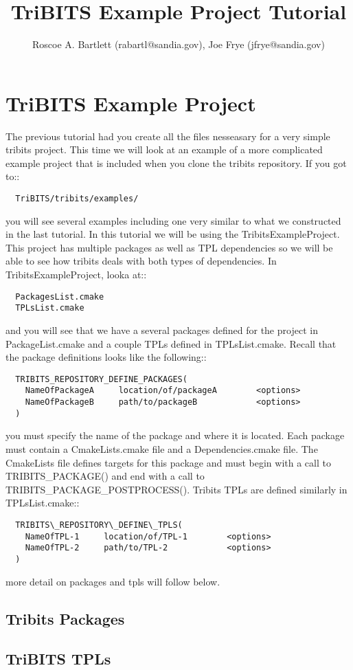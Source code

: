 \documentclass[12pt]{article}
\title{TriBITS  Example Project Tutorial}
\author{Roscoe A. Bartlett 
 (rabartl@sandia.gov), Joe Frye (jfrye@sandia.gov)}
\begin{document}
\maketitle
\section*{TriBITS Example Project}

The previous tutorial had you create all the files nesseasary for a
very simple tribits project.  This time we will look at an example of
a more complicated example project that is included when you clone the
tribits repository. If you got to::

\begin{verbatim}  
  TriBITS/tribits/examples/
\end{verbatim}

you will see several examples including one very similar to what we
constructed in the last tutorial.  In this tutorial we will be using
the TribitsExampleProject.  This project has multiple packages as well
as TPL dependencies so we will be able to see how tribits deals with
both types of dependencies. In TribitsExampleProject, looka at::

\begin{verbatim}
  PackagesList.cmake
  TPLsList.cmake
\end{verbatim}

and you will see that we have a several packages defined for the
project in PackageList.cmake and a couple TPLs defined in
TPLsList.cmake.  Recall that the package definitions looks like the
following::

\begin{verbatim}
  TRIBITS_REPOSITORY_DEFINE_PACKAGES(
    NameOfPackageA     location/of/packageA        <options>
    NameOfPackageB     path/to/packageB            <options>
  )
\end{verbatim}

you must specify the name of the package and where it is located.
Each package must contain a CmakeLists.cmake file and a
Dependencies.cmake file.  The CmakeLists file defines targets for this
package and must begin with a call to TRIBITS\_PACKAGE() and end with a
call to TRIBITS\_PACKAGE\_POSTPROCESS().  Tribits TPLs are defined
similarly in TPLsList.cmake::

\begin{verbatim}
  TRIBITS\_REPOSITORY\_DEFINE\_TPLS(
    NameOfTPL-1     location/of/TPL-1        <options>
    NameOfTPL-2     path/to/TPL-2            <options>
  )
\end{verbatim}

more detail on packages and tpls will follow below.  

\subsection*{Tribits Packages}


\subsection*{TriBITS TPLs}


\end{document}
